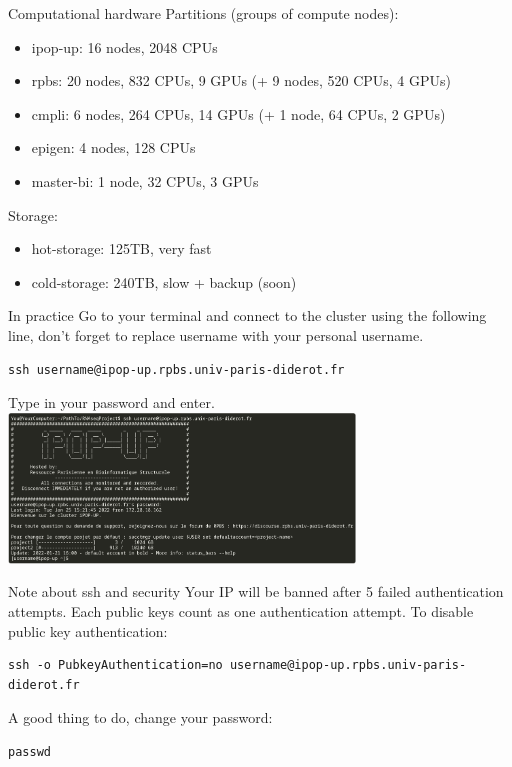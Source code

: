 \documentclass{beamer}
\begin{document}
\begin{frame}{Computational hardware}
Partitions (groups of compute nodes):
\begin{itemize}
    \item ipop-up: 16 nodes, 2048 CPUs
    \item rpbs: 20 nodes, 832 CPUs, 9 GPUs (+ 9 nodes, 520 CPUs, 4 GPUs)
    \item cmpli: 6 nodes, 264 CPUs, 14 GPUs (+ 1 node, 64 CPUs, 2 GPUs)
    \item epigen: 4 nodes, 128 CPUs
    \item master-bi: 1 node, 32 CPUs, 3 GPUs
\end{itemize}
Storage:
\begin{itemize}
    \item hot-storage: 125TB, very fast
    \item cold-storage: 240TB, slow + backup (soon)
\end{itemize}

\end{frame}

\begin{frame}[fragile]{In practice}
Go to your terminal and connect to the cluster using the following line, don't forget to replace username with your personal username.
\begin{verbatim}
ssh username@ipop-up.rpbs.univ-paris-diderot.fr
\end{verbatim}
Type in your password and  enter. 
\includegraphics[keepaspectratio=True, height=4cm]{Images/connexionCluster.png}
\end{frame}

\begin{frame}[fragile]{Note about ssh and security}
Your IP will be banned after 5 failed authentication attempts. Each public keys count as one authentication attempt. To disable public key authentication:
\begin{verbatim}
ssh -o PubkeyAuthentication=no username@ipop-up.rpbs.univ-paris-diderot.fr
\end{verbatim}
A good thing to do, change your password:   
\begin{verbatim}
passwd
\end{verbatim}

\end{frame}
\end{document}
